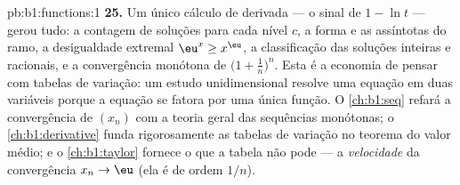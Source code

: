 \begin{solution}{pb:b1:functions:1}
\textbf{25.} Um único cálculo de derivada --- o sinal de $1 - \ln
t$ --- gerou tudo: a contagem de soluções para cada nível
$c$, a forma e as assíntotas do ramo, a desigualdade
extremal $\eu^x \geq x^\eu$, a classificação das soluções inteiras e
racionais, e a convergência monótona de $\bigl(1 +
\frac1n\bigr)^n$. Esta é a economia de pensar com tabelas de
variação: um estudo unidimensional resolve uma equação em duas
variáveis porque a equação se fatora por uma única função.
O \cref{ch:b1:seq} refará a convergência de $(x_n)$ com a
teoria geral das sequências monótonas; o \cref{ch:b1:derivative}
funda rigorosamente as tabelas de variação no teorema do valor médio; e
o \cref{ch:b1:taylor} fornece o que a tabela não pode --- a
\emph{velocidade} da convergência $x_n \to \eu$ (ela é de ordem
$1/n$).
\end{solution}
